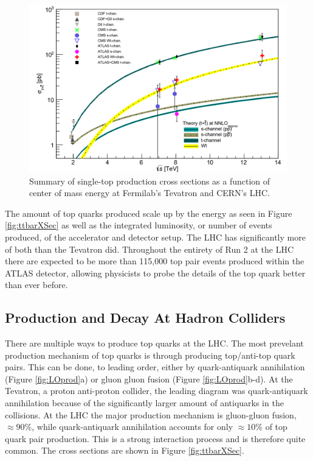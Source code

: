 \begin{figure}[h!]
	\centering
	\includegraphics[width=\columnwidth]{../ThesisImages/Theory/singtprodxsec.png}
	\caption[Summary of single-top production cross sections as a function of center of mass energy at Fermilab's Tevatron and CERN's LHC.]{Summary of single-top production cross sections as a function of center of mass energy at Fermilab's Tevatron and CERN's LHC\cite{TopWG}.}
	\label{fig:singtXSec}
\end{figure}

 The amount of top quarks produced scale up by the energy as seen in Figure \ref{fig:ttbarXSec} as well as the integrated luminosity, or number of events produced, of the accelerator and detector setup.  The LHC has significantly more of both than the Tevatron did.  Throughout the entirety of Run 2 at the LHC there are expected to be more than 115,000 top pair events produced within the ATLAS detector, allowing physicists to probe the details of the top quark better than ever before.  


\subsection{Production and Decay At Hadron Colliders}

There are multiple ways to produce top quarks at the LHC.  The most prevelant production mechanism of top quarks is through producing top/anti-top quark pairs.  This can be done, to leading order, either by quark-antiquark annihilation (Figure \ref{fig:LOprod}a) or gluon gluon fusion (Figure \ref{fig:LOprod}b-d).  At the Tevatron, a proton anti-proton collider, the leading diagram was quark-antiquark annihilation because of the significantly larger amount of antiquarks in the collisions.  At the LHC the major production mechanism is gluon-gluon fusion, $\approx 90\%$, while quark-antiquark annihilation accounts for only $\approx 10\%$  of top quark pair production.  This is a strong interaction process and is therefore quite common.  The cross sections are shown in Figure \ref{fig:ttbarXSec}.

